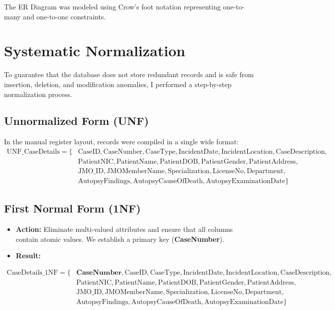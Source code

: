 \documentclass[12pt,a4paper]{article}
\begin{document}
The ER Diagram was modeled using Crow's foot notation representing one-to-many and one-to-one constraints.

\section{Systematic Normalization}
To guarantee that the database does not store redundant records and is safe from insertion, deletion, and modification anomalies, I performed a step-by-step normalization process.

\subsection{Unnormalized Form (UNF)}
In the manual register layout, records were compiled in a single wide format:
\begin{align*}
\text{UNF\_CaseDetails} = \{&\text{CaseID}, \text{CaseNumber}, \text{CaseType}, \text{IncidentDate}, \text{IncidentLocation}, \text{CaseDescription}, \\
&\text{PatientNIC}, \text{PatientName}, \text{PatientDOB}, \text{PatientGender}, \text{PatientAddress}, \\
&\text{JMO\_ID}, \text{JMOMemberName}, \text{Specialization}, \text{LicenseNo}, \text{Department}, \\
&\text{AutopsyFindings}, \text{AutopsyCauseOfDeath}, \text{AutopsyExaminationDate}\}
\end{align*}

\subsection{First Normal Form (1NF)}
\begin{itemize}
    \item \textbf{Action:} Eliminate multi-valued attributes and ensure that all columns contain atomic values. We establish a primary key (\textbf{CaseNumber}).
    \item \textbf{Result:}
\end{itemize}
\begin{align*}
\text{CaseDetails\_1NF} = \{&\textbf{CaseNumber}, \text{CaseID}, \text{CaseType}, \text{IncidentDate}, \text{IncidentLocation}, \text{CaseDescription}, \\
&\text{PatientNIC}, \text{PatientName}, \text{PatientDOB}, \text{PatientGender}, \text{PatientAddress}, \\
&\text{JMO\_ID}, \text{JMOMemberName}, \text{Specialization}, \text{LicenseNo}, \text{Department}, \\
&\text{AutopsyFindings}, \text{AutopsyCauseOfDeath}, \text{AutopsyExaminationDate}\}
\end{align*}
\end{document}
